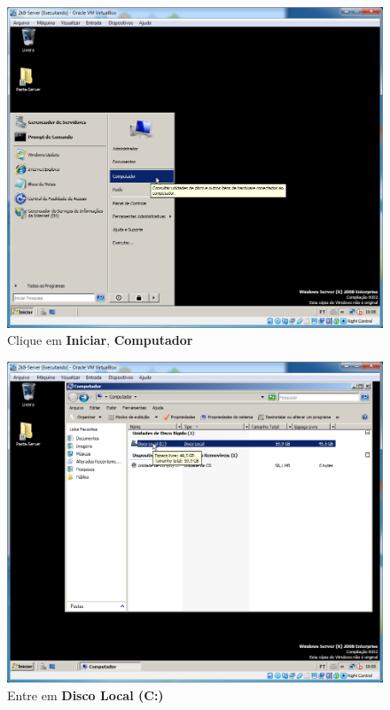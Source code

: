 \documentclass[10pt]{article}
\begin{document}
\begin{figure}[H]
    \centering
    \caption{Clique em \textbf{Iniciar}, \textbf{Computador}}
    \label{fig:5532022}
    \includegraphics[width=\linewidth]{images/IIS/criando_um_novo_site/022.png}
\end{figure}
\begin{figure}[H]
    \centering
    \caption{Entre em \textbf{Disco Local (C:)}}
    \label{fig:5532023}
    \includegraphics[width=\linewidth]{images/IIS/criando_um_novo_site/023.png}
\end{figure}
\end{document}
